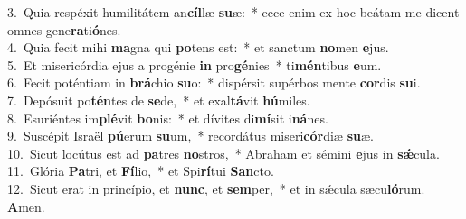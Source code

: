 {3.~}Quia respéxit humilitátem an\textbf{cíl}læ \textbf{su}æ:~* ecce enim ex hoc beátam me dicent omnes gene\textbf{ra}ti\textbf{ó}nes.\\
{4.~}Quia fecit mihi \textbf{ma}gna qui \textbf{po}tens est:~* et sanctum \textbf{no}men \textbf{e}jus.\\
{5.~}Et misericórdia ejus a progénie \textbf{in} pro\textbf{gé}nies~* ti\textbf{mén}tibus \textbf{e}um.\\
{6.~}Fecit poténtiam in \textbf{brá}chio \textbf{su}o:~* dispérsit supérbos mente \textbf{cor}dis \textbf{su}i.\\
{7.~}Depósuit po\textbf{tén}tes de \textbf{se}de,~* et exal\textbf{tá}vit \textbf{hú}miles.\\
{8.~}Esuriéntes im\textbf{plé}vit \textbf{bo}nis:~* et dívites di\textbf{mí}sit i\textbf{ná}nes.\\
{9.~}Suscépit Israël \textbf{pú}erum \textbf{su}um,~* recordátus miseri\textbf{cór}diæ \textbf{su}æ.\\
{10.~}Sicut locútus est ad \textbf{pa}tres \textbf{no}stros,~* Abraham et sémini \textbf{e}jus in \textbf{sǽ}cula.\\
{11.~}Glória \textbf{Pa}tri, et \textbf{Fí}lio,~* et Spi\textbf{rí}tui \textbf{San}cto.\\
{12.~}Sicut erat in princípio, et \textbf{nunc}, et \textbf{sem}per,~* et in sǽcula sæcu\textbf{ló}rum. \textbf{A}men.\\
